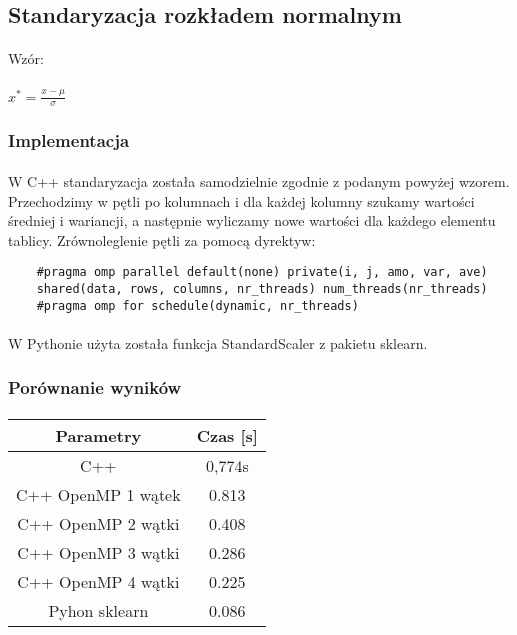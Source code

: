 \documentclass[a4paper,11pt]{article}
\begin{document}
\subsection{Standaryzacja rozkładem normalnym} 
\paragraph{} Wzór:
\paragraph{}$x^*=\frac{x-\mu}{\sigma}$
\subsubsection{Implementacja} 
\paragraph{}W C++ standaryzacja została samodzielnie zgodnie z podanym powyżej wzorem. Przechodzimy w pętli po kolumnach i dla każdej kolumny szukamy wartości średniej i wariancji, a następnie wyliczamy nowe wartości dla każdego elementu tablicy. Zrównoleglenie pętli za pomocą dyrektyw:
\begin{lstlisting}
	#pragma omp parallel default(none) private(i, j, amo, var, ave)
	shared(data, rows, columns, nr_threads) num_threads(nr_threads)
	#pragma omp for schedule(dynamic, nr_threads)
\end{lstlisting}

\paragraph{}W Pythonie użyta została funkcja StandardScaler z pakietu sklearn.

\subsubsection{Porównanie wyników} 

\paragraph{}
\begin{tabular}{|c|c|}
\hline Parametry&Czas [s] \\
\hline C++ & 0,774s \\
\hline C++ OpenMP 1 wątek& 0.813 \\
\hline C++ OpenMP 2 wątki& 0.408 \\
\hline C++ OpenMP 3 wątki& 0.286 \\
\hline C++ OpenMP 4 wątki& 0.225 \\\hline
\hline Pyhon sklearn& 0.086 \\
\hline
\end{tabular}
\end{document}
